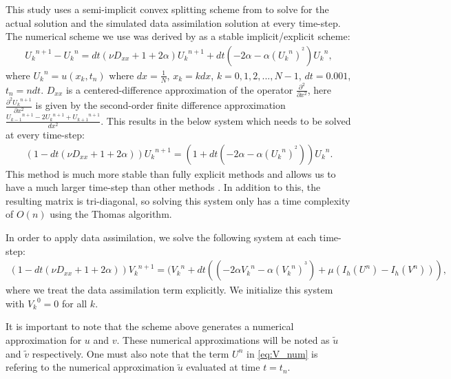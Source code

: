\documentclass[12pt]{amsart}
\theoremstyle{plain}
\theoremstyle{definition}
\theoremstyle{remark}
\numberwithin{equation}{section} %
\numberwithin{figure}{section}   %
\begin{document}
 This study uses a semi-implicit convex splitting scheme from \cite{Eyre_1997,Eyre_1998} to solve for the actual solution and the simulated data assimilation solution at every time-step. The numerical scheme we use was derived by \cite{Eyre_1997,Eyre_1998} as a stable implicit/explicit scheme:
 \begin{align*}
 {U_k}^{n+1} - {U_k}^n = dt(\nu D_{xx} + 1+2\alpha){U_k}^{n+1} + dt(-2\alpha - \alpha ({U_k}^{n})^{^2}){{U_k}^n},
 \end{align*} 
 where ${U_k}^{n} = u(x_k,t_n)$ where $dx = \frac{1}{N}$, $x_k = k dx$, $k = 0,1,2,...,N-1$, $dt = 0.001$, $t_n = n dt$. 
 $D_{xx}$ is a centered-difference approximation of the operator $\frac{\partial^2}{\partial x^2} $, here $\frac{\partial^2 {U_k}^{n+1}}{\partial x^2}$ is given by the second-order finite difference approximation $\frac{{U_{k-1}}^{n+1} - 2{U_{k}}^{n+1} + {U_{k+1}}^{n+1}}{dx^2} $. This results in the below system which needs to be solved at every time-step:
 \begin{align*}
 (1 - dt(\nu D_{xx} + 1+2\alpha)){U_k}^{n+1} =  (1+dt(-2\alpha - \alpha( {U_k}^{n})^{^2})){{U_k}^n}.
 \end{align*}
 This method is much more stable than fully explicit methods and allows us to have a much larger time-step than other methods \cite{Eyre_1997}. In addition to this, the resulting matrix is tri-diagonal, so solving this system only has a time complexity of $O(n)$ using the Thomas algorithm.
 
 In order to apply data assimilation, we solve the following system at each time-step:
 \begin{align}\label{eq:V_num}
 (1 - dt(\nu D_{xx} + 1+2\alpha)){V_k}^{n+1} =  ({V_k}^n+dt((-2\alpha{V_k}^n - \alpha ({V_k}^{n})^{^3}) +\mu(I_h(U^n) - I_h(V^n))),
 \end{align}
 where we treat the data assimilation term explicitly. We initialize this system with ${V_k}^0 = 0$ for all $k$.
 
 It is important to note that the scheme above generates a numerical approximation for $u$ and $v$. These numerical approximations will be noted as $\tilde{u}$ and $\tilde{v}$ respectively. One must also note that the term $U^n$ in \eqref{eq:V_num} is refering to the numerical approximation $\tilde{u}$ evaluated at time $t = t_n$.
 
\end{document}
